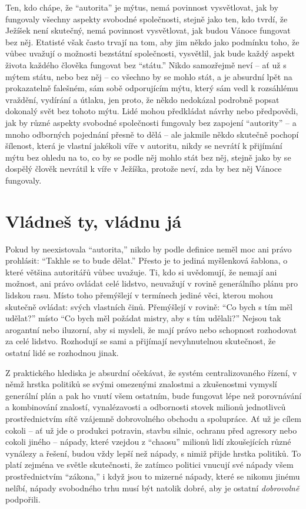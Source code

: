 \documentclass{book}
\begin{document}
Ten, kdo chápe, že \enquote{autorita} je mýtus, nemá povinnost vysvětlovat, jak by fungovaly všechny aspekty svobodné společnosti, stejně jako ten, kdo tvrdí, že Ježíšek není skutečný, nemá povinnost vysvětlovat, jak budou Vánoce fungovat bez něj. Etatisté však často trvají na tom, aby jim někdo jako podmínku toho, že vůbec uvažují o možnosti bezstátní společnosti, vysvětlil, jak bude každý aspekt života každého člověka fungovat bez \enquote{státu.} Nikdo samozřejmě neví -- ať už s mýtem státu, nebo bez něj -- co všechno by se mohlo stát, a je absurdní lpět na prokazatelně falešném, sám sobě odporujícím mýtu, který sám vedl k rozsáhlému vraždění, vydírání a útlaku, jen proto, že někdo nedokázal podrobně popsat dokonalý svět bez tohoto mýtu. Lidé mohou předkládat návrhy nebo předpovědi, jak by různé aspekty svobodné společnosti fungovaly bez zapojení \enquote{autority} -- a mnoho odborných pojednání přesně to dělá -- ale jakmile někdo skutečně pochopí šílenost, která je vlastní jakékoli víře v autoritu, nikdy se nevrátí k přijímání mýtu bez ohledu na to, co by se podle něj mohlo stát bez něj, stejně jako by se dospělý člověk nevrátil k víře v Ježíška, protože neví, zda by bez něj Vánoce fungovaly.

\section{Vládneš ty, vládnu já}

Pokud by neexistovala \enquote{autorita,} nikdo by podle definice neměl moc ani právo prohlásit: \enquote{Takhle se to bude dělat.} Přesto je to jediná myšlenková šablona, o které většina autoritářů vůbec uvažuje. Ti, kdo si uvědomují, že nemají ani možnost, ani právo ovládat celé lidstvo, neuvažují v rovině generálního plánu pro lidskou rasu. Místo toho přemýšlejí v termínech jediné věci, kterou mohou skutečně ovládat: svých vlastních činů. Přemýšlejí v rovině: \enquote{Co bych s tím měl udělat?} místo \enquote{Co bych měl požádat mistry, aby s tím udělali?} Nejsou tak arogantní nebo iluzorní, aby si mysleli, že mají právo nebo schopnost rozhodovat za celé lidstvo. Rozhodují se sami a přijímají nevyhnutelnou skutečnost, že ostatní lidé se rozhodnou jinak.

Z praktického hlediska je absurdní očekávat, že systém centralizovaného řízení, v němž hrstka politiků se svými omezenými znalostmi a zkušenostmi vymyslí generální plán a pak ho vnutí všem ostatním, bude fungovat lépe než porovnávání a kombinování znalostí, vynalézavosti a odbornosti stovek milionů jednotlivců prostřednictvím sítě vzájemně dobrovolného obchodu a spolupráce. Ať už je cílem cokoli -- ať už jde o produkci potravin, stavbu silnic, ochranu před agresory nebo cokoli jiného -- nápady, které vzejdou z \enquote{chaosu} milionů lidí zkoušejících různé vynálezy a řešení, budou vždy lepší než nápady, s nimiž přijde hrstka politiků. To platí zejména ve světle skutečnosti, že zatímco politici vnucují své nápady všem prostřednictvím \enquote{zákona,} i když jsou to mizerné nápady, které se nikomu jinému nelíbí, nápady svobodného trhu musí být natolik dobré, aby je ostatní \emph{dobrovolně} podpořili.
\end{document}
